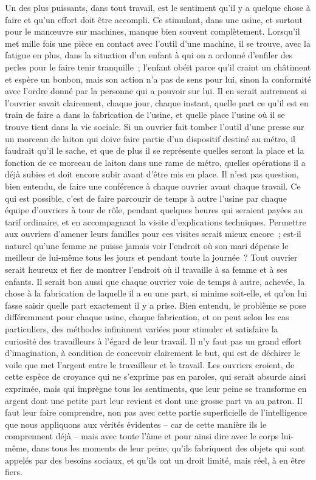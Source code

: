 \documentclass[french,twoside]{book} %
\begin{document}
Un des plus puissants, dans tout travail, est le sentiment qu'il y a quelque chose à faire et qu'un effort doit être accompli. Ce stimulant, dans une usine, et surtout pour le manœuvre sur machines, manque bien souvent complètement. Lorsqu'il met mille fois une pièce en contact avec l'outil d'une machine, il se trouve, avec la fatigue en plus, dans la situation d'un enfant à qui on a ordonné d'enfiler des perles pour le faire tenir tranquille ; l'enfant obéit parce qu'il craint un châtiment et espère un bonbon, mais son action n'a pas de sens pour lui, sinon la conformité avec l'ordre donné par la personne qui a pouvoir sur lui. Il en serait autrement si l'ouvrier savait clairement, chaque jour, chaque instant, quelle part ce qu'il est en train de faire a dans la fabrication de l'usine, et quelle place l'usine où il se trouve tient dans la vie sociale. Si un ouvrier fait tomber l'outil d'une presse sur un morceau de laiton qui doive faire partie d'un dispositif destiné au métro, il faudrait qu'il le sache, et que de plus il se représente quelles seront la place et la fonction de ce morceau de laiton dans une rame de métro, quelles opérations il a déjà subies et doit encore subir avant d'être mis en place. Il n'est pas question, bien entendu, de faire une conférence à chaque ouvrier avant chaque travail. Ce qui est possible, c'est de faire parcourir de temps à autre l'usine par chaque équipe d'ouvriers à tour de rôle, pendant quelques heures qui seraient payées au tarif ordinaire, et en accompagnant la visite d'explications techniques. Permettre aux ouvriers d'amener leurs familles pour ces visites serait mieux encore ; est-il naturel qu'une femme ne puisse jamais voir l'endroit où son mari dépense le meilleur de lui-même tous les jours et pendant toute la journée ? Tout ouvrier serait heureux et fier de montrer l'endroit où il travaille à sa femme et à ses enfants. Il serait bon aussi que chaque ouvrier voie de temps à autre, achevée, la chose à la fabrication de laquelle il a eu une part, si minime soit-elle, et qu'on lui fasse saisir quelle part exactement il y a prise. Bien entendu, le problème se pose différemment pour chaque usine, chaque fabrication, et on peut selon les cas particuliers, des méthodes infiniment variées pour stimuler et satisfaire la curiosité des travailleurs à l'égard de leur travail. Il n'y faut pas un grand effort d'imagination, à condition de concevoir clairement le but, qui est de déchirer le voile que met l'argent entre le travailleur et le travail. Les ouvriers croient, de cette espèce de croyance qui ne s'exprime pas en paroles, qui serait absurde ainsi exprimée, mais qui imprègne tous les sentiments, que leur peine se transforme en argent dont une petite part leur revient et dont une grosse part va au patron. Il faut leur faire comprendre, non pas avec cette partie superficielle de l'intelligence que nous appliquons aux vérités évidentes – car de cette manière ils le comprennent déjà – mais avec toute l'âme et pour ainsi dire avec le corps lui-même, dans tous les moments de leur peine, qu'ils fabriquent des objets qui sont appelés par des besoins sociaux, et qu'ils ont un droit limité, mais réel, à en être fiers.\par
\end{document}
